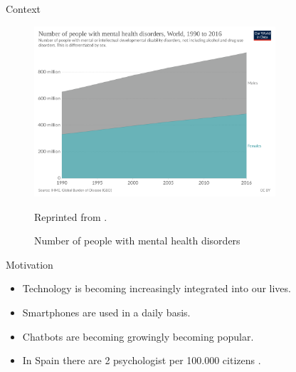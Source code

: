 \documentclass{beamer}
\begin{document}
\begin{frame}[fragile]{Context}
\begin{figure}[H]
  \centering
  \includegraphics[width=0.8\textwidth]{number_mental_health.png}
  \caption{Number of people with mental health disorders}{Reprinted from \cite{owidmentalhealth}.}
\end{figure}
\end{frame}
\begin{frame}[fragile]{Motivation}
  \begin{itemize}[<+->]
    \item Technology is becoming increasingly integrated into our lives.
    \item Smartphones are used in a daily basis.
    \item Chatbots are becoming growingly becoming popular.
    \item In Spain there are 2 psychologist per 100.000 citizens \cite{elmundo}.
  \end{itemize}
\end{frame}
\end{document}
